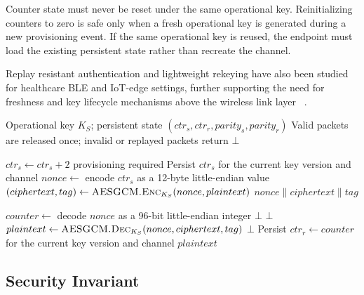 \documentclass[journal]{IEEEtran}
\begin{document}
Counter state must never be reset under the same operational key. Reinitializing counters to zero is safe only when a fresh operational key is generated during a new provisioning event. If the same operational key is reused, the endpoint must load the existing persistent state rather than recreate the channel.

Replay resistant authentication and lightweight rekeying have also been studied for healthcare BLE and IoT-edge settings, further supporting the need for freshness and key lifecycle mechanisms above the wireless link layer ~\cite{rakshit2025dsekp}.

\begin{algorithm}[!t]
\caption{CipherChannel Send/Receive Procedure}
\label{alg:counternonce}
\footnotesize
\begin{algorithmic}[1]
\Require Operational key $K_S$; persistent state $(ctr_s, ctr_r, parity_s, parity_r)$
\Ensure Valid packets are released once; invalid or replayed packets return $\bot$

  \State $ctr_s \leftarrow ctr_s + 2$
    \State \Return provisioning required
  \EndIf
  \State Persist $ctr_s$ for the current key version and channel
  \State $nonce \leftarrow$ encode $ctr_s$ as a 12-byte little-endian value
  \State $(ciphertext, tag) \leftarrow \textsc{AESGCM.Enc}_{K_S}(nonce, plaintext)$
  \State \Return $nonce \| ciphertext \| tag$
\EndFunction

\Statex

  \State $counter \leftarrow$ decode $nonce$ as a 96-bit little-endian integer
    \State \Return $\bot$ 
  \EndIf
    \State \Return $\bot$ 
  \EndIf
  \State $plaintext \leftarrow \textsc{AESGCM.Dec}_{K_S}(nonce,ciphertext,tag)$
    \State \Return $\bot$ 
  \EndIf
  \State Persist $ctr_r \leftarrow counter$ for the current key version and channel
  \State \Return $plaintext$
\EndFunction
\end{algorithmic}
\end{algorithm}

\subsection{Security Invariant}
\label{sec:securityinvariants}
\end{document}
